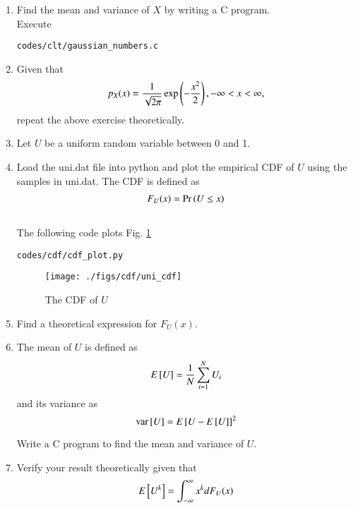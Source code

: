 \begin{enumerate}[label=\thesubsection.\arabic*
,ref=\thesection.\theenumi]
\item Find the mean and variance of $X$ by writing a C program.
\\
\solution  Execute
\begin{lstlisting}
codes/clt/gaussian_numbers.c
\end{lstlisting}
\item Given that 
\begin{align}
p_{X}(x) = \frac{1}{\sqrt{2\pi}}\exp\left(-\frac{x^2}{2}\right), -\infty < x < \infty,
\end{align}
repeat the above exercise theoretically.
%
\\
\solution

\item Let $U$ be a uniform random variable between 0 and 1.

%
\item
Load the uni.dat file into python and plot the empirical CDF of $U$ using the samples in uni.dat. The CDF is defined as
\begin{align}
F_{U}(x) = \Pr\left(U \le x\right)
\end{align}
\\
\solution  The following code plots Fig. \ref{fig:uni_cdf}
\begin{lstlisting}
codes/cdf/cdf_plot.py
\end{lstlisting}
\begin{figure}
\centering
\texttt{[image: ./figs/cdf/uni\_cdf]}
\caption{The CDF of $U$}
\label{fig:uni_cdf}
\end{figure}



%
\item
Find a  theoretical expression for $F_{U}(x)$.

\item
The mean of $U$ is defined as
%
\begin{equation}
E{}\left[U\right] = \frac{1}{N}\sum_{i=1}^{N}U_i
\end{equation}
%
and its variance as
%
\begin{equation}
\text{var}{}\left[U\right] = E{}\left[U- E{}\left[U\right]\right]^2 
\end{equation}

Write a C program to  find the mean and variance of $U$. 
\item Verify your result theoretically given that
%
\begin{equation}
E{}\left[U^k\right] = \int_{-\infty}^{\infty}x^kdF_{U}(x)
\end{equation}

\end{enumerate}



